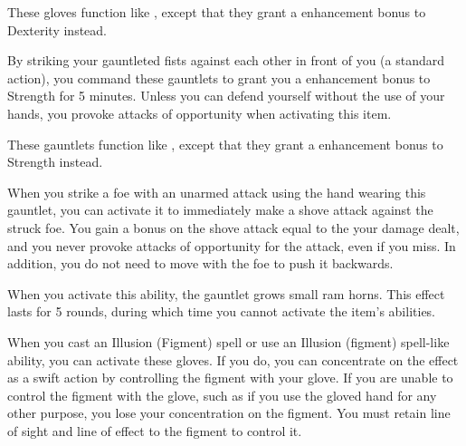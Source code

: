  These gloves function like , except that they grant a  enhancement bonus to Dexterity instead.


 By striking your gauntleted fists against each other in front of you (a standard action), you command these gauntlets to grant you a  enhancement bonus to Strength for 5 minutes. Unless you can defend yourself without the use of your hands, you provoke attacks of opportunity when activating this item.


 These gauntlets function like , except that they grant a  enhancement bonus to Strength instead.


 When you strike a foe with an unarmed attack using the hand wearing this gauntlet, you can activate it to immediately make a shove attack against the struck foe. You gain a bonus on the shove attack equal to the your damage dealt, and you never provoke attacks of opportunity for the attack, even if you miss. In addition, you do not need to move with the foe to push it backwards.

When you activate this ability, the gauntlet grows small ram horns. This effect lasts for 5 rounds, during which time you cannot activate the item's abilities.


 When you cast an Illusion (Figment) spell or use an Illusion (figment) spell-like ability, you can activate these gloves. If you do, you can concentrate on the effect as a swift action by controlling the figment with your glove. If you are unable to control the figment with the glove, such as if you use the gloved hand for any other purpose, you lose your concentration on the figment. You must retain line of sight and line of effect to the figment to control it.

